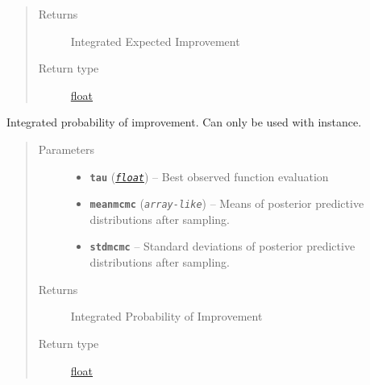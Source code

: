 \documentclass[letterpaper,10pt,english]{sphinxmanual}
\begin{document}
\begin{fulllineitems}
\begin{fulllineitems}
\begin{quote}
\begin{description}
\item[{Returns}] \leavevmode
Integrated Expected Improvement

\item[{Return type}] \leavevmode
\href{https://docs.python.org/2/library/functions.html\#float}{float}

\end{description}\end{quote}

\end{fulllineitems}


\begin{fulllineitems}
\label{pyGPGO.acquisition:pyGPGO.acquisition.Acquisition.IntegratedProbabilityImprovement}
Integrated probability of improvement. Can only be used with  instance.
\begin{quote}\begin{description}
\item[{Parameters}] \leavevmode\begin{itemize}
\item {} 
\textbf{\texttt{tau}} (\href{https://docs.python.org/2/library/functions.html\#float}{\emph{\texttt{float}}}) -- Best observed function evaluation

\item {} 
\textbf{\texttt{meanmcmc}} (\emph{\texttt{array-like}}) -- Means of posterior predictive distributions after sampling.

\item {} 
\textbf{\texttt{stdmcmc}} -- Standard deviations of posterior predictive distributions after sampling.

\end{itemize}

\item[{Returns}] \leavevmode
Integrated Probability of Improvement

\item[{Return type}] \leavevmode
\href{https://docs.python.org/2/library/functions.html\#float}{float}

\end{description}\end{quote}

\end{fulllineitems}


\end{fulllineitems}
\end{document}
